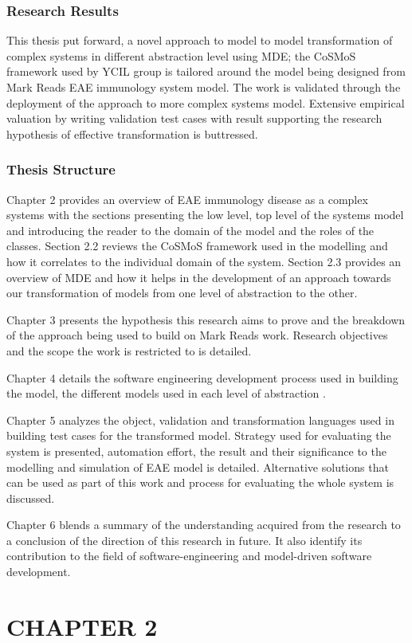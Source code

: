 \documentclass[10pt]{article}
\begin{document}
\subsection{Research Results}

This thesis put forward, a novel approach to model to model transformation of complex systems in different abstraction level using MDE; the CoSMoS framework used by YCIL group is tailored around the model being designed from Mark Reads EAE immunology system model. The work is validated through the deployment of the approach to more complex systems model. Extensive empirical valuation by writing validation test cases with result supporting the research hypothesis of effective transformation is buttressed. 

\subsection{Thesis Structure}
Chapter 2 provides an overview of EAE immunology disease as a complex systems with the sections presenting the low level, top level of the systems model and introducing the reader to the domain of the model and the roles of the classes. Section 2.2 reviews the CoSMoS framework used in the modelling and how it correlates to the individual domain of the system. Section 2.3 provides an overview of MDE and how it helps in the development of an approach towards our transformation of models from one level of abstraction to the other.

Chapter 3 presents the hypothesis this research aims to prove and the breakdown of the approach being used to build on Mark Reads work. Research objectives and the scope the work is restricted to is detailed.

Chapter 4 details the software engineering development process used in building the model, the different models used in each level of abstraction .

Chapter 5 analyzes the object, validation and transformation languages used in building test cases for the transformed model. Strategy used for evaluating the system is presented, automation effort, the result and their significance to the modelling and simulation of EAE model is detailed. Alternative solutions that can be used as part of this work and process for evaluating the whole system is discussed.

Chapter 6 blends a summary of the understanding acquired from the research to a conclusion of the direction of this research in future. It also identify its contribution to the field of software-engineering and model-driven software development.

\chapter{CHAPTER 2}



  
\end{document}

